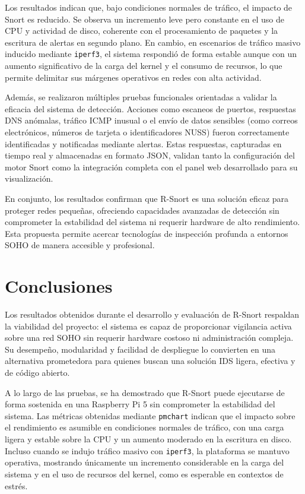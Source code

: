 \documentclass[11pt,a4paper,twoside]{report}
\begin{document}
Los resultados indican que, bajo condiciones normales de tráfico, el impacto de Snort es reducido. Se observa un incremento leve pero constante en el uso de CPU y actividad de disco, coherente con el procesamiento de paquetes y la escritura de alertas en segundo plano. En cambio, en escenarios de tráfico masivo inducido mediante \texttt{iperf3}, el sistema respondió de forma estable aunque con un aumento significativo de la carga del kernel y el consumo de recursos, lo que permite delimitar sus márgenes operativos en redes con alta actividad.\newline

Además, se realizaron múltiples pruebas funcionales orientadas a validar la eficacia del sistema de detección. Acciones como escaneos de puertos, respuestas DNS anómalas, tráfico ICMP inusual o el envío de datos sensibles (como correos electrónicos, números de tarjeta o identificadores NUSS) fueron correctamente identificadas y notificadas mediante alertas. Estas respuestas, capturadas en tiempo real y almacenadas en formato JSON, validan tanto la configuración del motor Snort como la integración completa con el panel web desarrollado para su visualización.\newline

En conjunto, los resultados confirman que R-Snort es una solución eficaz para proteger redes pequeñas, ofreciendo capacidades avanzadas de detección sin comprometer la estabilidad del sistema ni requerir hardware de alto rendimiento. Esta propuesta permite acercar tecnologías de inspección profunda a entornos SOHO de manera accesible y profesional.


\chapter*{Conclusiones}
\setcounter{secnumdepth}{0}

Los resultados obtenidos durante el desarrollo y evaluación de R-Snort respaldan la viabilidad del proyecto: el sistema es capaz de proporcionar vigilancia activa sobre una red SOHO sin requerir hardware costoso ni administración compleja. Su desempeño, modularidad y facilidad de despliegue lo convierten en una alternativa prometedora para quienes buscan una solución IDS ligera, efectiva y de código abierto.\newline

A lo largo de las pruebas, se ha demostrado que R-Snort puede ejecutarse de forma sostenida en una Raspberry Pi 5 sin comprometer la estabilidad del sistema. Las métricas obtenidas mediante \texttt{pmchart} indican que el impacto sobre el rendimiento es asumible en condiciones normales de tráfico, con una carga ligera y estable sobre la CPU y un aumento moderado en la escritura en disco. Incluso cuando se indujo tráfico masivo con \texttt{iperf3}, la plataforma se mantuvo operativa, mostrando únicamente un incremento considerable en la carga del sistema y en el uso de recursos del kernel, como es esperable en contextos de estrés.\newline
\end{document}
